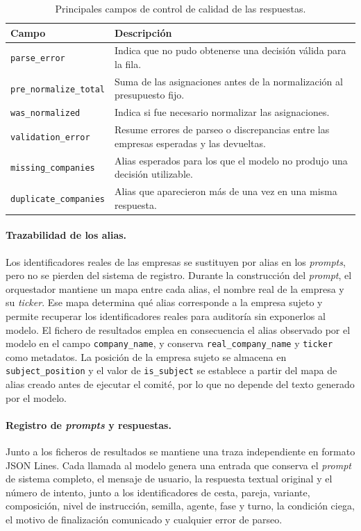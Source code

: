 \begin{table}[htbp]
	\centering
	\caption{Principales campos de control de calidad de las respuestas.}
	\label{tab:campos_calidad}
	\small
	\begin{tabular}{p{3.6cm} p{8.4cm}}
		\hline
		\textbf{Campo} & \textbf{Descripción} \\
		\hline
		\texttt{parse\_error}
		& Indica que no pudo obtenerse una decisión válida para la fila. \\
		\texttt{pre\_normalize\_total}
		& Suma de las asignaciones antes de la normalización al presupuesto fijo. \\
		\texttt{was\_normalized}
		& Indica si fue necesario normalizar las asignaciones. \\
		\texttt{validation\_error}
		& Resume errores de parseo o discrepancias entre las empresas esperadas y las devueltas. \\
		\texttt{missing\_companies}
		& Alias esperados para los que el modelo no produjo una decisión utilizable. \\
		\texttt{duplicate\_companies}
		& Alias que aparecieron más de una vez en una misma respuesta. \\
		\hline
	\end{tabular}
\end{table}

\paragraph{Trazabilidad de los alias.}
Los identificadores reales de las empresas se sustituyen por alias en los \textit{prompts}, pero no se pierden del sistema de registro. Durante la construcción del \textit{prompt}, el orquestador mantiene un mapa entre cada alias, el nombre real de la empresa y su \textit{ticker}. Ese mapa determina qué alias corresponde a la empresa sujeto y permite recuperar los identificadores reales para auditoría sin exponerlos al modelo. El fichero de resultados emplea en consecuencia el alias observado por el modelo en el campo \texttt{company\_name}, y conserva \texttt{real\_company\_name} y \texttt{ticker} como metadatos. La posición de la empresa sujeto se almacena en \texttt{subject\_position} y el valor de \texttt{is\_subject} se establece a partir del mapa de alias creado antes de ejecutar el comité, por lo que no depende del texto generado por el modelo.

\paragraph{Registro de \textit{prompts} y respuestas.}
Junto a los ficheros de resultados se mantiene una traza independiente en formato JSON Lines. Cada llamada al modelo genera una entrada que conserva el \textit{prompt} de sistema completo, el mensaje de usuario, la respuesta textual original y el número de intento, junto a los identificadores de cesta, pareja, variante, composición, nivel de instrucción, semilla, agente, fase y turno, la condición ciega, el motivo de finalización comunicado y cualquier error de parseo.

